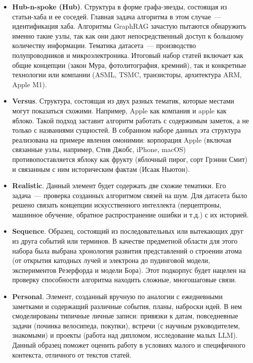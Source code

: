 \begin{itemize}
      \item \textbf{Hub-n-spoke (Hub)}. Структура в форме графа-звезды,
            состоящая из статьи-хаба и ее соседей.
            Главная задача алгоритма в этом случае~--- идентификация хаба.
            Алгоритмы GraphRAG зачастую пытаются обнаружить именно такие узлы,
            так как они дают непосредственный доступ к большому количеству информации.
            Тематика датасета~--- производство полупроводников и микроэлектроника.
            Итоговый набор статей включает как общие концепции (закон Мура, фотолитография, кремний),
            так и конкретные технологии или компании (ASML, TSMC, транзисторы, архитектура ARM, Apple M1).
      \item \textbf{Versus}. Структура, состоящая из двух разных тематик, которые местами могут показаться схожими.
            Например, Apple как компания и apple как яблоко.
            Такой подход заставит алгоритм работать с содержимым заметок, а не только с названиями сущностей.
            В собранном наборе данных эта структура реализована на примере явления омонимии:
            корпорация Apple (включая связанные узлы, например, Стив Джобс, iPhone, macOS)
            противопоставляется яблоку как фрукту (яблочный пирог, сорт Грэнни Смит)
            и связанным с ним историческим фактам (Исаак Ньютон).
      \item \textbf{Realistic}. Данный элемент будет содержать две схожие тематики.
            Его задача~--- проверка созданных алгоритмом связей на шум.
            Для датасета было решено связать
            концепции искусственного интеллекта (перцептроны, машинное обучение,
            обратное распространение ошибки и т.д.) с их историей.
      \item \textbf{Sequence}. Образец,
            состоящий из последовательных или вытекающих друг из друга событий или терминов.
            В качестве предметной области для этого набора была выбрана хронология развития представлений
            о строении атома (от открытия катодных лучей и электрона до пудинговой модели,
            экспериментов Резерфорда и модели Бора).
            Этот подкорпус будет нацелен на проверку способности алгоритма находить сложные, многошаговые связи.
      \item \textbf{Personal}. Элемент,
            созданный вручную по аналогии с ежедневными заметками и содержащий различные события,
            планы, наброски идей.
            В нем смоделированы типичные личные записи: привязки к датам,
            повседневные задачи (починка велосипеда, покупки), встречи (с научным руководителем, знакомыми)
            и проекты (работа над дипломом, исследование малых LLM).
            Данный образец поможет оценить работу в условиях малого и специфичного контекста,
            отличного от текстов статей.
\end{itemize}


